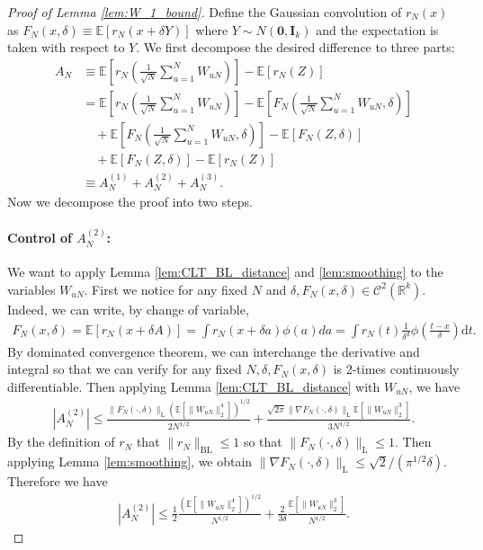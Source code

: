 \documentclass[12pt]{article}
\newcommand{\E}{\mathbb E}								%
\begin{document}
\begin{proof}[Proof of Lemma \ref{lem:W_1_bound}]
	Define the Gaussian convolution of $r_N(x)$ as $F_N(x,\delta)\equiv \E[r_N(x+\delta Y)]$ where $Y\sim N(\bm 0,\bm I_k)$ and the expectation is taken with respect to $Y$. We first decompose the desired difference to three parts: 
	\begin{align*}
		A_N
		&
		\equiv \E\left[r_N\left(\frac{1}{\sqrt{N}}\sum_{u=1}^N W_{uN}\right)\right]-\E\left[r_N\left(Z\right)\right]\\
		&
		=\E\left[r_N\left(\frac{1}{\sqrt{N}}\sum_{u=1}^N W_{uN}\right)\right]-\E\left[F_N\left(\frac{1}{\sqrt{N}}\sum_{u=1}^N W_{uN},\delta\right)\right]\\
		&
		\quad +\E\left[F_N\left(\frac{1}{\sqrt{N}}\sum_{u=1}^N W_{uN},\delta\right)\right]-\E\left[F_N\left(Z,\delta\right)\right]\\
		&
		\quad +\E\left[F_N\left(Z,\delta\right)\right]-\E\left[r_N\left(Z\right)\right]\\
		&
		\equiv A_N^{(1)}+A_N^{(2)}+A_N^{(3)}.
	\end{align*}
	\noindent Now we decompose the proof into two steps. 
	
	\paragraph{Control of $A_{N}^{(2)}$:}
	
	We want to apply Lemma \ref{lem:CLT_BL_distance} and \ref{lem:smoothing} to the variables $W_{uN}$. First we notice for any fixed $N$ and $\delta,F_N(x,\delta)\in \mathcal{C}^2(\mathbb{R}^k)$. Indeed, we can write, by change of variable,
	\begin{align*}
		F_N(x,\delta)=\E[r_N(x+\delta A)]=\int r_N(x+\delta a)\phi(a)da=\int r_N(t)\frac{1}{\delta^d}\phi\left(\frac{t-x}{\delta}\right)\mathrm{d}t.
	\end{align*}
	By dominated convergence theorem, we can interchange the derivative and integral so that we can verify for any fixed $N,\delta,F_N(x,\delta)$ is 2-times continuously differentiable. Then applying Lemma \ref{lem:CLT_BL_distance} with $W_{uN}$, we have
	\begin{align*}
		|A_{N}^{(2)}|\leq \frac{\|F_N(\cdot, \delta)\|_{\mathrm{L}}\left(\E[\|W_{uN}\|_2^4]\right)^{1/2}}{2N^{1/2}}+\frac{\sqrt{2\pi}\|\nabla F_N(\cdot, \delta)\|_{\mathrm{L}}\E[\|W_{uN}\|_2^3]}{3N^{1/2}}.
	\end{align*}
	By the definition of $r_N$ that $\|r_N\|_{\mathrm{BL}}\leq 1$ so that $\|F_N(\cdot, \delta)\|_{\mathrm{L}}\leq 1$. Then applying Lemma \ref{lem:smoothing}, we obtain $\|\nabla F_N(\cdot, \delta)\|_{\mathrm{L}}\leq \sqrt{2}/(\pi^{1/2}\delta)$.
	Therefore we have 
	\begin{align*}
		|A_{N}^{(2)}|\leq \frac{1}{2}\frac{\left(\E[\|W_{uN}\|_2^4]\right)^{1/2}}{N^{1/2}}+\frac{2}{3\delta}\frac{\E[\|W_{uN}\|_2^3]}{N^{1/2}}.
	\end{align*}
	

\end{proof}
\end{document}

